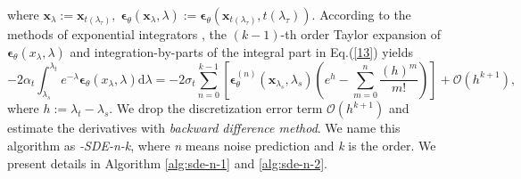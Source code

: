 where $\boldsymbol{x}_{\lambda}:=\boldsymbol{x}_{t(\lambda_\tau)},\;\boldsymbol{\epsilon}_\theta(\boldsymbol{x}_\lambda,\lambda):=\boldsymbol{\epsilon}_\theta(\boldsymbol{x}_{t(\lambda_\tau)},t(\lambda_\tau))$. According to the methods of exponential integrators \citep{hochbruck2010exponential,hochbruck2005explicit}, the $(k-1)$-th order Taylor expansion of $\boldsymbol{\epsilon}_\theta(x_\lambda,\lambda)$ and integration-by-parts of the integral part in Eq.(\ref{13}) yields 
\begin{equation}
-2\alpha_t\int_{\lambda_s}^{\lambda_t}e^{-\lambda}\boldsymbol{\epsilon}_\theta(x_\lambda,\lambda)\mathrm{d}\lambda=
-2\sigma_{t}\sum_{n=0}^{k-1}\left[\boldsymbol{\epsilon}_\theta^{(n)}(\boldsymbol{x}_{\lambda_{s}},\lambda_{s})\left(e^{h}-\sum_{m=0}^n\frac{(h)^m}{m!}\right)\right]
+\mathcal{O}(h^{k+1}),
\label{14}
\end{equation}
where $h:=\lambda_t-\lambda_s$. We drop the discretization error term $\mathcal{O}(h^{k+1})$ and estimate the derivatives with \textit{backward difference method}. We name this algorithm as \textit{\ourmethod-SDE-n-k}, where \textit{n} means noise prediction and \textit{k} is the order. We present details in Algorithm \ref{alg:sde-n-1} and \ref{alg:sde-n-2}.



